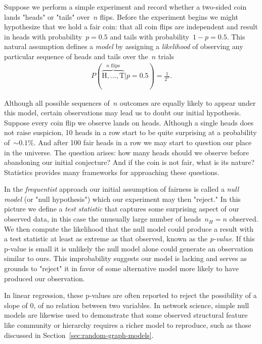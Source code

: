 Suppose we perform a simple experiment and record whether a two-sided coin lands "heads" or "tails" over~$n$ flips. Before the experiment begins we might hypothesize that we hold a fair coin: that all coin flips are independent and result in heads with probability~$p = 0.5$ and tails with probability~$1 - p = 0.5$. This natural assumption defines a \emph{model} by assigning a \emph{likelihood} of observing any particular sequence of heads and tails over the~$n$ trials \begin{align}
    P(\overbrace{\text{H},...,\text{T}}^{n \text{ flips}}|p = 0.5) = \frac{1}{2^n}. \label{eq:coin-flip-fair-likelihood}
\end{align} 

Although all possible sequences of~$n$ outcomes are equally likely to appear under this model, certain observations may lead us to doubt our initial hypothesis. Suppose every coin flip we observe lands on heads. Although a single heads does not raise suspicion, 10 heads in a row start to be quite surprising at a probability of~$\sim 0.1\%$. And after 100 fair heads in a row we may start to question our place in the universe. The question arises: how many heads should we observe before abandoning our initial conjecture? And if the coin is not fair, what is its nature? Statistics provides many frameworks for approaching these questions.

In the \emph{frequentist} approach our initial assumption of fairness is called a \emph{null model} (or "null hypothesis") which our experiment may then "reject." In this picture we define a \emph{test statistic} that captures some surprising aspect of our observed data, in this case the unusually large number of heads~$n_H = n$ observed. We then compute the likelihood that the null model could produce a result with a test statistic at least as extreme as that observed, known as the \emph{p-value}. If this p-value is small it is unlikely the null model alone could generate an observation similar to ours. This improbability suggests our model is lacking and serves as grounds to "reject" it in favor of some alternative model more likely to have produced our observation. 

In linear regression, these p-values are often reported to reject the possibility of a slope of 0, of no relation between two variables. In network science, simple null models are likewise used to demonstrate that some observed structural feature like community or hierarchy requires a richer model to reproduce, such as those discussed in Section~\ref{sec:random-graph-models}.

